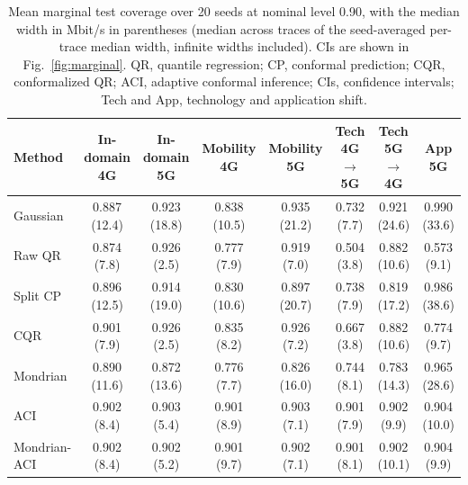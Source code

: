 \begin{table}[!t]
\caption{Mean marginal test coverage over 20 seeds at nominal level 0.90, with the median width in Mbit/s in parentheses (median across traces of the seed-averaged per-trace median width, infinite widths included). CIs are shown in Fig.~\ref{fig:marginal}. QR, quantile regression; CP, conformal prediction; CQR, conformalized QR; ACI, adaptive conformal inference; CIs, confidence intervals; Tech and App, technology and application shift.}
\label{tab:main}
\centering
\footnotesize
\setlength{\tabcolsep}{4pt}
\begin{tabular}{lccccccc}
\toprule
Method & In-domain 4G & In-domain 5G & Mobility 4G & Mobility 5G & Tech 4G$\rightarrow$5G & Tech 5G$\rightarrow$4G & App 5G \\
\midrule
Gaussian & 0.887 (12.4) & 0.923 (18.8) & 0.838 (10.5) & 0.935 (21.2) & 0.732 (7.7) & 0.921 (24.6) & 0.990 (33.6) \\
Raw QR & 0.874 (7.8) & 0.926 (2.5) & 0.777 (7.9) & 0.919 (7.0) & 0.504 (3.8) & 0.882 (10.6) & 0.573 (9.1) \\
Split CP & 0.896 (12.5) & 0.914 (19.0) & 0.830 (10.6) & 0.897 (20.7) & 0.738 (7.9) & 0.819 (17.2) & 0.986 (38.6) \\
CQR & 0.901 (7.9) & 0.926 (2.5) & 0.835 (8.2) & 0.926 (7.2) & 0.667 (3.8) & 0.882 (10.6) & 0.774 (9.7) \\
Mondrian & 0.890 (11.6) & 0.872 (13.6) & 0.776 (7.7) & 0.826 (16.0) & 0.744 (8.1) & 0.783 (14.3) & 0.965 (28.6) \\
ACI & 0.902 (8.4) & 0.903 (5.4) & 0.901 (8.9) & 0.903 (7.1) & 0.901 (7.9) & 0.902 (9.9) & 0.904 (10.0) \\
Mondrian-ACI & 0.902 (8.4) & 0.902 (5.2) & 0.901 (9.7) & 0.902 (7.1) & 0.901 (8.1) & 0.902 (10.1) & 0.904 (9.9) \\
\bottomrule
\end{tabular}
\end{table}
